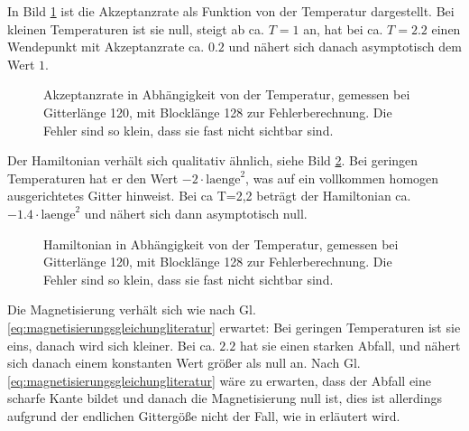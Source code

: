 	
	
	In Bild \ref{fig:ergebnisakzeptanzrate} ist die Akzeptanzrate als Funktion von der Temperatur dargestellt. Bei kleinen Temperaturen ist sie null, steigt ab ca. $T=1$ an, hat bei ca. $T=\num{2,2}$ einen Wendepunkt mit Akzeptanzrate ca. $\num{0,2}$ und nähert sich danach asymptotisch dem Wert $1$.
	
	\begin{figure}[htbp]
		
		\caption[Akzeptanzrate in Abhängigkeit von der Temperatur]{Akzeptanzrate in Abhängigkeit von der Temperatur, gemessen bei Gitterlänge 120, mit Blocklänge 128 zur Fehlerberechnung. Die Fehler sind so klein, dass sie fast nicht sichtbar sind.}
		\label{fig:ergebnisakzeptanzrate}
	\end{figure}
	
	Der Hamiltonian verhält sich qualitativ ähnlich, siehe Bild \ref{fig:ergebnishamiltonian}. Bei geringen Temperaturen hat er den Wert $-2\cdot\text{laenge}^2$, was auf ein vollkommen homogen ausgerichtetes Gitter hinweist. Bei ca T=2,2 beträgt der Hamiltonian ca. $-\num{1,4}\cdot\text{laenge}^2$ und nähert sich dann asymptotisch null.
	
	\begin{figure}[htbp]
		
		\caption[Hamiltonian in Abhängigkeit von der Temperatur]{Hamiltonian in Abhängigkeit von der Temperatur, gemessen bei Gitterlänge 120, mit Blocklänge 128 zur Fehlerberechnung. Die Fehler sind so klein, dass sie fast nicht sichtbar sind.}
		\label{fig:ergebnishamiltonian}
	\end{figure}
	

	Die Magnetisierung verhält sich wie nach Gl. \ref{eq:magnetisierungsgleichungliteratur} erwartet: Bei geringen Temperaturen ist sie eins, danach wird sich kleiner. Bei ca. $\num{2,2}$ hat sie einen starken Abfall, und nähert sich danach einem konstanten Wert größer als null an. Nach Gl. \ref{eq:magnetisierungsgleichungliteratur} wäre zu erwarten, dass der Abfall eine scharfe Kante bildet und danach die Magnetisierung null ist, dies ist allerdings aufgrund der endlichen Gittergöße nicht der Fall, wie in \cite[Abschnitt 2.3.3]{binderheermann} erläutert wird.

